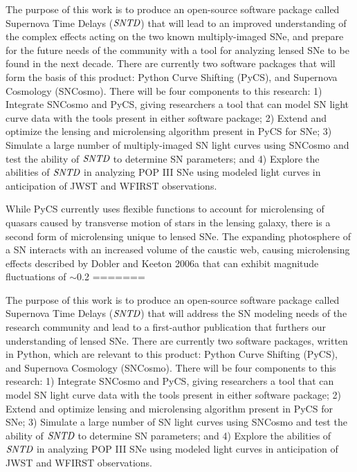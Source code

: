 The purpose of this work is to produce an open-source software
package called Supernova Time Delays ($\textit{SNTD}$) that will
lead to an improved understanding of the complex effects acting on the two known multiply-imaged SNe, and prepare for the future needs of the community with a tool for analyzing lensed SNe to be found in the next decade. There are currently two software packages
that will form the basis of this product: Python Curve Shifting (PyCS), and
Supernova Cosmology (SNCosmo). There will be four components to this
research: 1) Integrate SNCosmo and PyCS, giving researchers a tool
that can model SN light curve data with the tools present in either
software package; 2) Extend and optimize the lensing and microlensing
algorithm present in PyCS for SNe; 3) Simulate a large number of multiply-imaged SN
light curves using SNCosmo and test the ability of $\textit{SNTD}$ to
determine SN parameters; and 4) Explore the abilities of
$\textit{SNTD}$ in analyzing POP III SNe using modeled light curves in
anticipation of JWST and WFIRST observations.



While PyCS currently uses flexible functions to account for
microlensing of quasars caused by transverse motion of stars in the
lensing galaxy, there is a second form of microlensing unique to
lensed SNe. The expanding photosphere of a SN interacts with
an increased volume of the caustic web, causing microlensing effects 
described by Dobler and Keeton 2006a that can exhibit magnitude fluctuations of $\sim$0.2
=======


The purpose of this work is to produce an open-source software
package called Supernova Time Delays ($\textit{SNTD}$) that will
address the SN modeling needs of the research community and lead to a
first-author publication that furthers our understanding of lensed
SNe. There are currently two software packages, written in Python,
which are relevant to this product: Python Curve Shifting (PyCS), and
Supernova Cosmology (SNCosmo). There will be four components to this
research: 1) Integrate SNCosmo and PyCS, giving researchers a tool
that can model SN light curve data with the tools present in either
software package; 2) Extend and optimize lensing and microlensing
algorithm present in PyCS for SNe; 3) Simulate a large number of SN
light curves using SNCosmo and test the ability of $\textit{SNTD}$ to
determine SN parameters; and 4) Explore the abilities of
$\textit{SNTD}$ in analyzing POP III SNe using modeled light curves in
anticipation of JWST and WFIRST observations.

